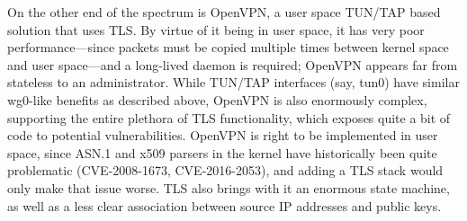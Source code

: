 On the other end of the spectrum is OpenVPN, a user space TUN/TAP based solution that uses TLS. By virtue of it being in user space, it has very poor performance—since packets must be copied multiple times between kernel space and user space—and a long-lived daemon is required; OpenVPN appears far from stateless to an administrator. While TUN/TAP interfaces (say, tun0) have similar wg0-like benefits as described above, OpenVPN is also enormously complex, supporting the entire plethora of TLS functionality, which exposes quite a bit of code to potential vulnerabilities. OpenVPN is right to be implemented in user space, since ASN.1 and x509 parsers in the kernel have historically been quite problematic (CVE-2008-1673, CVE-2016-2053), and adding a TLS stack would only make that issue worse. TLS also brings with it an enormous state machine, as well as a less clear association between source IP addresses and public keys.

